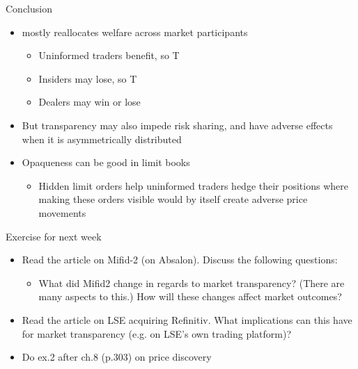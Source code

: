 \documentclass[english,10pt
,aspectratio=169
]{beamer}
\begin{document}
\begin{frame}{Conclusion}
	\begin{itemize}
		\item {} mostly reallocates welfare across market participants 
		\begin{itemize}
			\item Uninformed traders benefit, so T 
			\item Insiders may lose, so T 
			\item Dealers may win or lose
		\end{itemize}
		\item But transparency may also impede risk sharing, and have adverse effects when it is asymmetrically distributed
		\item Opaqueness can be good in limit books
		\begin{itemize}
			\item Hidden limit orders help uninformed traders hedge their positions where making these orders visible would by itself create adverse price movements
		\end{itemize}
	\end{itemize}
\end{frame}


\begin{frame}{Exercise for next week}
	\begin{itemize}
		\item Read the article on Mifid-2 (on Absalon). Discuss the following questions:
		\begin{itemize}
			\item What did Mifid2 change in regards to market transparency? (There are many aspects to this.) How will these changes affect market outcomes?
		\end{itemize}
		\item Read the article on LSE acquiring Refinitiv. What implications can this have for market transparency (e.g. on LSE's own trading platform)?
		\item Do ex.2 after ch.8 (p.303) on price discovery
	\end{itemize}
\end{frame}
\end{document}
